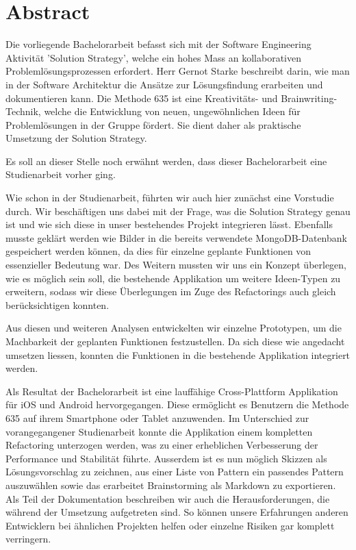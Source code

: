 \thispagestyle{empty}
\section*{Abstract}
Die vorliegende Bachelorarbeit befasst sich mit der Software Engineering Aktivität 'Solution Strategy', welche ein hohes Mass an kollaborativen Problemlösungsprozessen erfordert. Herr Gernot Starke beschreibt darin, wie man in der Software Architektur die Ansätze zur Lösungsfindung erarbeiten und dokumentieren kann. Die Methode 635 ist eine Kreativitäts- und Brainwriting-Technik, welche die Entwicklung von neuen, ungewöhnlichen Ideen für Problemlösungen in der Gruppe fördert. Sie dient daher als praktische Umsetzung der Solution Strategy.

Es soll an dieser Stelle noch erwähnt werden, dass dieser Bachelorarbeit eine Studienarbeit \cite{methode635-sa} vorher ging.

Wie schon in der Studienarbeit, führten wir auch hier zunächst eine Vorstudie durch. Wir beschäftigen uns dabei mit der Frage, was die Solution Strategy genau ist und wie sich diese in unser bestehendes Projekt integrieren lässt. Ebenfalls musste geklärt werden wie Bilder in die bereits verwendete MongoDB-Datenbank gespeichert werden können, da dies für einzelne geplante Funktionen von essenzieller Bedeutung war. Des Weitern mussten wir uns ein Konzept überlegen, wie es möglich sein soll, die bestehende Applikation um weitere Ideen-Typen zu erweitern, sodass wir diese Überlegungen im Zuge des Refactorings auch gleich berücksichtigen konnten. 

Aus diesen und weiteren Analysen entwickelten wir einzelne Prototypen, um die Machbarkeit der geplanten Funktionen festzustellen. Da sich diese wie angedacht umsetzen liessen, konnten die Funktionen in die bestehende Applikation integriert werden. 

Als Resultat der Bachelorarbeit ist eine lauffähige Cross-Plattform Applikation für iOS und Android hervorgegangen. Diese ermöglicht es Benutzern die Methode 635 auf ihrem Smartphone oder Tablet anzuwenden. Im Unterschied zur vorangegangener Studienarbeit konnte die Applikation einem kompletten Refactoring unterzogen werden, was zu einer erheblichen Verbesserung der Performance und Stabilität führte. Ausserdem ist es nun möglich Skizzen als Lösungsvorschlag zu zeichnen, aus einer Liste von Pattern ein passendes Pattern auszuwählen sowie das erarbeitet Brainstorming als Markdown zu exportieren. Als Teil der Dokumentation beschreiben wir auch die Herausforderungen, die während der Umsetzung aufgetreten sind. So können unsere Erfahrungen anderen Entwicklern bei ähnlichen Projekten helfen oder einzelne Risiken gar komplett verringern.   
